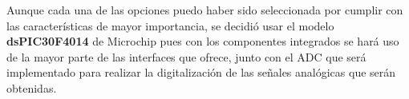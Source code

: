 Aunque cada una de las opciones puedo haber sido seleccionada por cumplir con las características de mayor importancia, se decidió usar el modelo \textbf{dsPIC30F4014} de Microchip pues con los componentes integrados se hará uso de la mayor parte de las interfaces que ofrece, junto con el ADC que será implementado para realizar la digitalización de las señales analógicas que serán obtenidas.
